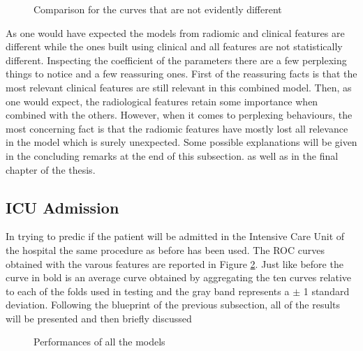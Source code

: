 \begin{figure}[H]
\centering
        \caption{Comparison for the curves that are not evidently different}\label{fig:delongDeath}
\end{figure}

As one would have expected the models from radiomic and clinical features are different while the ones built using clinical and all features are not statistically different. Inspecting the coefficient of the parameters there are a few perplexing things to notice and a few reassuring ones. First of the reassuring facts is that the most relevant clinical features are still relevant in this combined model. Then, as one would expect, the radiological features retain some importance when combined with the others. However, when it comes to perplexing behaviours, the most concerning fact is that the radiomic features have mostly lost all relevance in the model which is surely unexpected. Some possible explanations will be given in the concluding remarks at the end of this  subsection. as well as in the final chapter of the thesis.

\subsection{ICU Admission}

In trying to predic if the patient will be admitted in the Intensive Care Unit of the hospital the same procedure as before has been used. The ROC curves obtained with the varous features are reported in Figure \ref{fig:ICULasso}. Just like before the curve in bold is an average curve obtained by aggregating the ten curves relative to each of the folds used in testing and the gray band represents a $\pm$ 1 standard deviation. Following the blueprint of the previous subsection, all of the results will be presented and then  briefly discussed


\begin{figure}[H]
\centering
	\newline
        \caption{Performances of all the models}\label{fig:ICULasso}
\end{figure}


